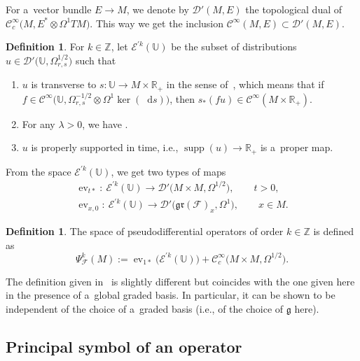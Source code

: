\documentclass[pdftex]{sigma}
\newcommand{\supp}{\operatorname{supp}} %
\newcommand*\diff{\mathop{}\!\mathrm{d}} %
\newcommand{\R}{\mathbb R} %
\newcommand{\Z}{\mathbb Z} %
\newcommand{\CCC}{\mathscr{C}} %
\newcommand{\g}{\mathfrak{g}} %
\newcommand{\hd}{\Omega^{1/2}} %
\newcommand{\ev}{\operatorname{ev}} %
\newcommand{\Fb}{\mathcal{F}} %
\newcommand{\gr}{\mathfrak{gr}} %
\newcommand{\U}{\mathbb U} %
\numberwithin{equation}{section}
\theoremstyle{definition}
\newtheorem{mydef}[thm]{Definition}
\begin{document}
 For a~vector bundle $E\to M$, we denote by $\mathcal{D}'(M,E)$ the topological dual of $\CCC^{\infty}_c\bigl(M,E^*\otimes \Omega^1TM\bigr)$. This way we get the inclusion $\CCC^{\infty}(M,E) \subset \mathcal{D}'(M,E)$.

\begin{mydef}
 For $k \in \Z$, let $\mathcal{E}^{'k}(\U)$ be the subset of distributions $u\in \mathcal{D}'\bigl(\U,\hd_{r,s}\bigr)$ such that%
 \begin{enumerate}
\itemsep=0pt
 \item[(1)] $u$ is transverse to $s \colon \U \to M\times \R_+$ in the sense of~\cite{AndroulidakisSkandalisHolonomy}, which means that if $f \in \CCC^{\infty}\bigl(\U,\Omega^{-1/2}_{r,s}\otimes \Omega^1\ker(\diff s)\bigr)$, then $s_*(fu) \in \CCC^{\infty}(M\times\R_+)$.
 \item[(2)] For any $\lambda>0$, we have \smash{$\alpha_{\lambda*}u-\lambda^ku\in\CCC^{\infty}_c\bigl(\U,\hd_{r,s}\bigr)$}.
 \item[(3)] $u$ is properly supported in time, i.e., $\supp(u)\to \R_+$ is a~proper map.
 \end{enumerate}
\end{mydef}

From the space $\mathcal{E}^{'k}(\U)$, we get two types of maps
\begin{gather*}
 \ev_{t*} \colon\ \mathcal{E}^{'k}(\U) \to \mathcal{D}'\bigl(M\times M,\hd\bigr),\qquad t > 0,\\
 \ev_{x,0} \colon\ \mathcal{E}^{'k}(\U) \to \mathcal{D}'\bigl(\gr(\Fb)_x,\Omega^1\bigr),\qquad x\in M.
\end{gather*}

\begin{mydef}
 The space of pseudodifferential operators of order $k\in \Z$ is defined as
 \[\Psi^k_{\Fb}(M):= \ev_{1*}\bigl(\mathcal{E}^{'k}(\U)\bigr) + \CCC^{\infty}_c\bigl(M\times M,\hd\bigr).\]
\end{mydef}

The definition given in~\cite{AMYMaximalHypoellipticity} is slightly different but coincides with the one given here in the presence of a~global graded basis. In particular, it can be shown to be independent of the choice of a~graded basis (i.e., of the choice of $\g$ here).

\subsection{Principal symbol of an operator}\label{Subsection:PrincipalSymbol}
\end{document}
